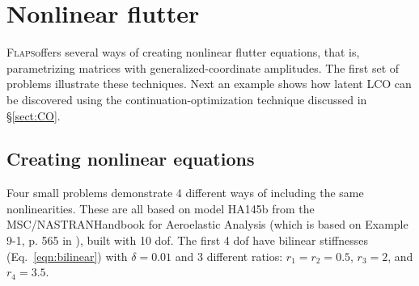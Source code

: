 \documentclass[10pt,openany,twoside]{book}
\numberwithin{equation}{section}   %
\newcommand{\Flaps}{{\normalfont\scshape Flaps\:}}
\newcommand{\Nastran}{{\footnotesize{NASTRAN\:}}}
\newcommand{\Sectref}[1]{\S\ref{#1}}
\newcommand{\Eqn}[1]{Eq.\ \ref{#1}}
\begin{document}
\newpage
\section{Nonlinear flutter}\label{ex:nl1234}
\Flaps offers several ways of creating nonlinear flutter equations,
that is, parametrizing matrices with generalized-coordinate amplitudes.
The first set of problems illustrate these techniques. Next an example
shows how latent LCO can be discovered using the continuation-optimization
technique discussed in \Sectref{sect:CO}.

\subsection{Creating nonlinear equations}
Four small problems demonstrate 4 different ways of including the
same nonlinearities.
These are all based on model HA145b from the MSC/\Nastran Handbook
for Aeroelastic Analysis \cite{rodden2009msc} (which is based on
Example 9-1, p. 565 in \cite{bisplinghoff1955aeroelasticity}),
built with 10 dof.
The first 4 dof have bilinear stiffnesses (\Eqn{eqn:bilinear})
with $\delta = 0.01$ and 3 different ratios: $r_1 = r_2 = 0.5$,
$r_3 = 2$, and $r_4 = 3.5$.
\end{document}
